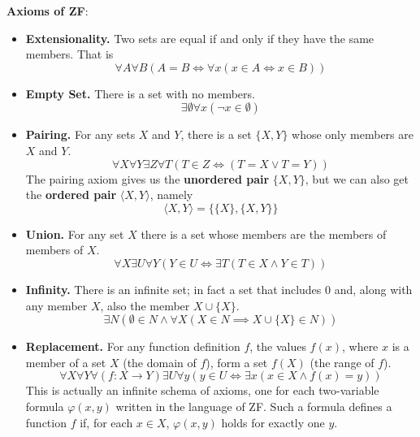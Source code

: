 \documentclass[12pt, a4paper, oneside, openright, titlepage]{book}
\begin{document}
\textbf{Axioms of ZF}:
\begin{itemize}
    \item \textbf{Extensionality.} Two sets are equal if and only if they have the same members. That is \begin{equation*}
            \forall A\forall B(A=B\iff \forall x(x \in A\iff x \in B))
    \end{equation*}
    \item \textbf{Empty Set.} There is a set with no members. \begin{equation*}
            \exists \emptyset\forall x(\lnot x \in \emptyset)
    \end{equation*}
    \item \textbf{Pairing.} For any sets $X$ and $Y$, there is a set $\{X,Y\}$ whose only members are $X$ and $Y$. \begin{equation*}
        \forall X \forall Y\exists Z\forall T(T \in Z\iff (T = X\lor T = Y))
    \end{equation*}
        The pairing axiom gives us the \textbf{unordered pair} $\{X,Y\}$, but we can also get the \textbf{ordered pair} $\langle X,Y\rangle$, namely \begin{equation*}
            \langle X,Y\rangle = \{\{X\},\{X,Y\}\}
        \end{equation*}
    \item \textbf{Union.} For any set $X$ there is a set whose members are the members of members of $X$. \begin{equation*}
            \forall X\exists U\forall Y(Y \in U \iff \exists T(T \in X \land Y \in T))
    \end{equation*}
    \item \textbf{Infinity.} There is an infinite set; in fact a set that includes $0$ and, along with any member $X$, also the member $X \cup \{X\}$. \begin{equation*}
            \exists N(\emptyset \in N \land \forall X(X \in N\implies X\cup \{X\} \in N))
    \end{equation*}
    \item \textbf{Replacement.} For any function definition $f$, the values $f(x)$, where $x$ is a member of a set $X$ (the domain of $f$), form a set $f(X)$ (the range of $f$). \begin{equation*}
            \forall X\forall Y\forall (f:X\rightarrow Y)\exists U\forall y(y \in U \iff \exists x(x \in X\land f(x) = y))
    \end{equation*}
        This is actually an infinite schema of axioms, one for each two-variable formula $\varphi(x,y)$ written in the language of ZF. Such a formula defines a function $f$ if, for each $x \in X$, $\varphi(x,y)$ holds for exactly one $y$.

\end{itemize}
\end{document}

